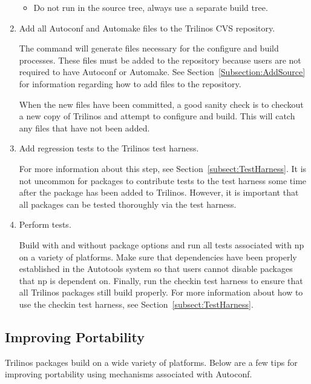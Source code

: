 \documentclass[12pt,relax]{TrilinosDevGuide}
\begin{document}
\begin{enumerate}
\begin{itemize}
\item Do not run  in the source tree, always use a 
separate build tree.

\end{itemize}

\item Add all Autoconf and Automake files to the Trilinos CVS repository.

The  command will generate files necessary for the 
configure and build processes.  These files must be added to the repository 
because users are not required to have Autoconf or Automake.  See 
Section~\ref{Subsection:AddSource} for information regarding how to add files 
to the repository.

When the new files have been committed, a good sanity check is to checkout 
a new copy of Trilinos and attempt to configure and build.  This will catch 
any files that have not been added.

\item Add regression tests to the Trilinos test harness.

For more information about this step, see Section~\ref{subsect:TestHarness}.
It is not uncommon for packages to contribute tests to the test harness some 
time after the package has been added to Trilinos.  However, it is important 
that all packages can be tested thoroughly via the test harness.

\item Perform tests.

Build with and without package options and run all tests associated with np on 
a variety of platforms.  Make sure that dependencies have been properly 
established in the Autotools system so that users cannot disable packages that 
np is dependent on.  Finally, run the checkin test harness to ensure that 
all Trilinos packages still build properly.  For more information about how 
to use the checkin test harness, see Section~\ref{subsect:TestHarness}.

\end{enumerate}

\subsection{Improving Portability}

Trilinos packages build on a wide variety of platforms.  Below are a few tips 
for improving portability using mechanisms associated with Autoconf.
\end{document}
